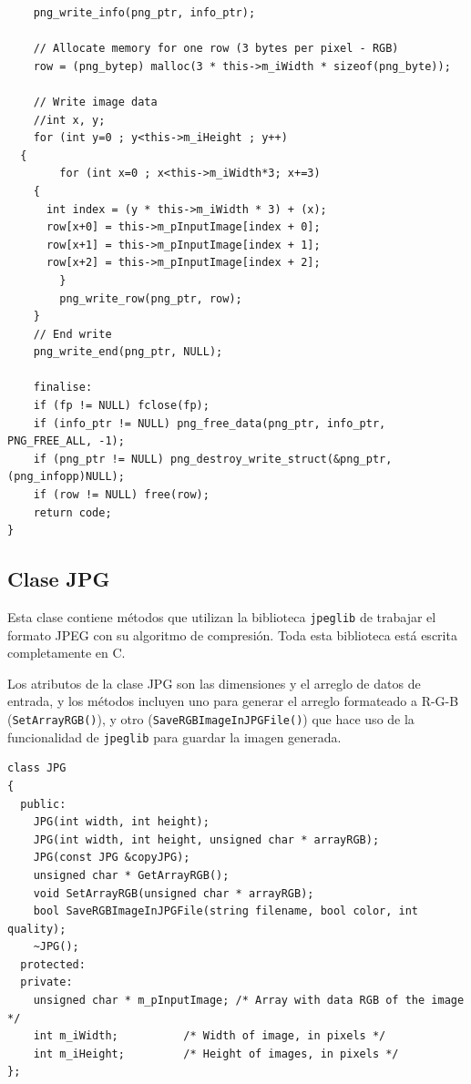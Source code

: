 \begin{itemize}
\begin{verbatim}
	png_write_info(png_ptr, info_ptr);

	// Allocate memory for one row (3 bytes per pixel - RGB)
	row = (png_bytep) malloc(3 * this->m_iWidth * sizeof(png_byte));

	// Write image data
	//int x, y;
	for (int y=0 ; y<this->m_iHeight ; y++)
  {
		for (int x=0 ; x<this->m_iWidth*3; x+=3)
    {
      int index = (y * this->m_iWidth * 3) + (x);
      row[x+0] = this->m_pInputImage[index + 0];
      row[x+1] = this->m_pInputImage[index + 1];
      row[x+2] = this->m_pInputImage[index + 2];
		}
		png_write_row(png_ptr, row);
	}
	// End write
	png_write_end(png_ptr, NULL);

	finalise:
	if (fp != NULL) fclose(fp);
	if (info_ptr != NULL) png_free_data(png_ptr, info_ptr, PNG_FREE_ALL, -1);
	if (png_ptr != NULL) png_destroy_write_struct(&png_ptr, (png_infopp)NULL);
	if (row != NULL) free(row);
	return code;
}
    \end{verbatim}
    
\end{itemize}

\subsection{Clase JPG}
Esta clase contiene métodos que utilizan la biblioteca \texttt{jpeglib} de trabajar el formato JPEG con su algoritmo de compresión. Toda esta biblioteca está escrita completamente en C. 

Los atributos de la clase JPG son las dimensiones y el arreglo de datos de entrada, y los métodos incluyen uno para generar el arreglo formateado a R-G-B (\texttt{SetArrayRGB()}), y otro (\texttt{SaveRGBImageInJPGFile()}) que hace uso de la funcionalidad de \texttt{jpeglib} para guardar la imagen generada.

\begin{verbatim}
class JPG
{
  public:
    JPG(int width, int height);
    JPG(int width, int height, unsigned char * arrayRGB);
    JPG(const JPG &copyJPG);
    unsigned char * GetArrayRGB();
    void SetArrayRGB(unsigned char * arrayRGB);
    bool SaveRGBImageInJPGFile(string filename, bool color, int quality);
    ~JPG();
  protected:
  private:
    unsigned char * m_pInputImage; /* Array with data RGB of the image */
    int m_iWidth;          /* Width of image, in pixels */
    int m_iHeight;         /* Height of images, in pixels */
};
\end{verbatim}

